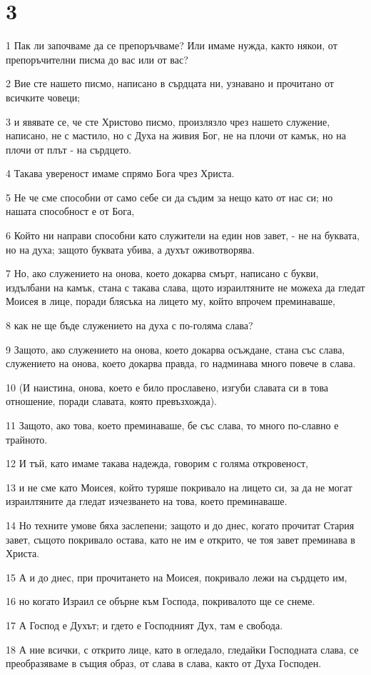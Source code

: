 \chapter{3}

\par 1 Пак ли започваме да се препоръчваме? Или имаме нужда, както някои, от препоръчителни писма до вас или от вас?
\par 2 Вие сте нашето писмо, написано в сърдцата ни, узнавано и прочитано от всичките човеци;
\par 3 и явявате се, че сте Христово писмо, произлязло чрез нашето служение, написано, не с мастило, но с Духа на живия Бог, не на плочи от камък, но на плочи от плът - на сърдцето.
\par 4 Такава увереност имаме спрямо Бога чрез Христа.
\par 5 Не че сме способни от само себе си да съдим за нещо като от нас си; но нашата способност е от Бога,
\par 6 Който ни направи способни като служители на един нов завет, - не на буквата, но на духа; защото буквата убива, а духът оживотворява.
\par 7 Но, ако служението на онова, което докарва смърт, написано с букви, издълбани на камък, стана с такава слава, щото израилтяните не можеха да гледат Моисея в лице, поради блясъка на лицето му, който впрочем преминаваше,
\par 8 как не ще бъде служението на духа с по-голяма слава?
\par 9 Защото, ако служението на онова, което докарва осъждане, стана със слава, служението на онова, което докарва правда, го надминава много повече в слава.
\par 10 (И наистина, онова, което е било прославено, изгуби славата си в това отношение, поради славата, която превъзхожда).
\par 11 Защото, ако това, което преминаваше, бе със слава, то много по-славно е трайното.
\par 12 И тъй, като имаме такава надежда, говорим с голяма откровеност,
\par 13 и не сме като Моисея, който туряше покривало на лицето си, за да не могат израилтяните да гледат изчезването на това, което преминаваше.
\par 14 Но техните умове бяха заслепени; защото и до днес, когато прочитат Стария завет, същото покривало остава, като не им е открито, че тоя завет преминава в Христа.
\par 15 А и до днес, при прочитането на Моисея, покривало лежи на сърдцето им,
\par 16 но когато Израил се обърне към Господа, покривалото ще се снеме.
\par 17 А Господ е Духът; и гдето е Господният Дух, там е свобода.
\par 18 А ние всички, с открито лице, като в огледало, гледайки Господната слава, се преобразяваме в същия образ, от слава в слава, както от Духа Господен.

